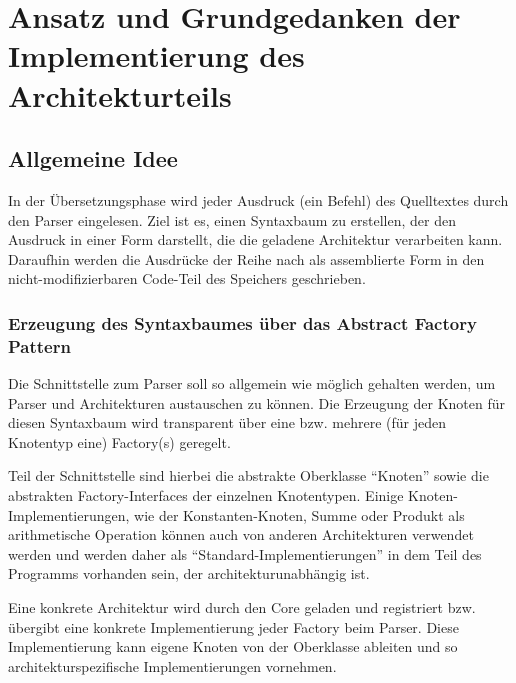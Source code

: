 
\section{Ansatz und Grundgedanken der Implementierung des Architekturteils}
\subsection{Allgemeine Idee}
In der Übersetzungsphase wird jeder Ausdruck (ein Befehl) des Quelltextes durch den Parser eingelesen. Ziel ist es, einen Syntaxbaum zu erstellen, der den Ausdruck in einer Form darstellt, die die geladene Architektur verarbeiten kann. Daraufhin werden die Ausdrücke der Reihe nach als assemblierte Form in den nicht-modifizierbaren Code-Teil des Speichers geschrieben.

\subsubsection{Erzeugung des Syntaxbaumes über das Abstract Factory Pattern}
Die Schnittstelle zum Parser soll so allgemein wie möglich gehalten werden, um Parser und Architekturen austauschen zu können. Die Erzeugung der Knoten für diesen Syntaxbaum wird transparent über eine bzw. mehrere (für jeden Knotentyp eine) Factory(s) geregelt.

Teil der Schnittstelle sind hierbei die abstrakte Oberklasse ``Knoten'' sowie die abstrakten Factory-Interfaces der einzelnen Knotentypen. Einige Knoten-Implementierungen, wie der Konstanten-Knoten, Summe oder Produkt als arithmetische Operation können auch von anderen Architekturen verwendet werden und werden daher als ``Standard-Implementierungen'' in dem Teil des Programms vorhanden sein, der architekturunabhängig ist.

Eine konkrete Architektur wird durch den Core geladen und registriert bzw. übergibt eine konkrete Implementierung jeder Factory beim Parser. Diese Implementierung kann eigene Knoten von der Oberklasse ableiten und so architekturspezifische Implementierungen vornehmen.

